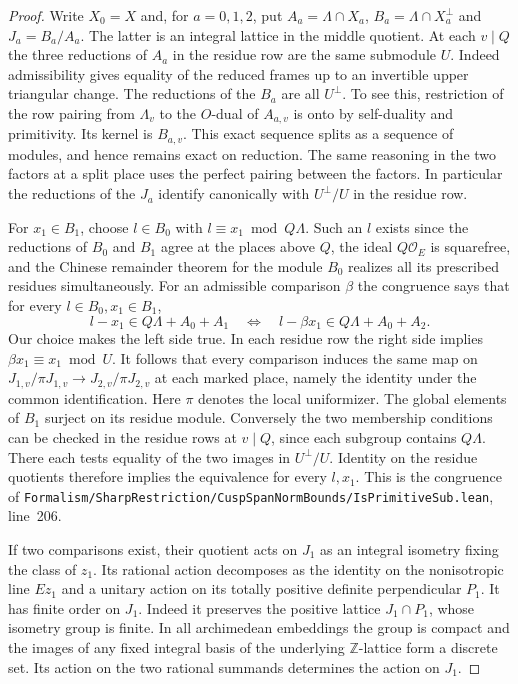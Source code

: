 \documentclass[a4paper,11pt]{article}
\theoremstyle{definition}
\theoremstyle{remark}
\newcommand{\ZZ}{\mathbb Z}\newcommand{\ord}{\operatorname{ord}}
\newcommand{\srcloc}[2]{{\small\nolinkurl{#1.lean}}, line~#2}
\numberwithin{equation}{section}
\newcommand{\OO}{\mathcal O}
\begin{document}
\begin{proof}
Write \(X_0=X\) and, for \(a=0,1,2\), put
\(A_a=\Lambda\cap X_a\), \(B_a=\Lambda\cap X_a^\perp\)
and \(J_a=B_a/A_a\). The latter is an integral lattice in
the middle quotient. At each \(v\mid Q\) the three reductions
of \(A_a\) in the residue row are the same submodule \(U\).
Indeed admissibility gives equality of the reduced frames up
to an invertible upper triangular change. The reductions of
the \(B_a\) are all \(U^\perp\). To see this, restriction of
the row pairing from \(\Lambda_v\) to the \(O\)-dual of
\(A_{a,v}\) is onto by self-duality and primitivity. Its
kernel is \(B_{a,v}\). This exact sequence splits as a
sequence of modules, and hence remains exact on reduction.
The same reasoning in the two factors at a split place uses
the perfect pairing between the factors. In particular
the reductions of the \(J_a\) identify canonically with
\(U^\perp/U\) in the residue row.

For \(x_1\in B_1\), choose \(l\in B_0\) with
\(l\equiv x_1\bmod Q\Lambda\). Such an \(l\) exists since
the reductions of \(B_0\) and \(B_1\) agree at the places
above \(Q\), the ideal \(Q\OO_E\) is squarefree, and the
Chinese remainder theorem for the module \(B_0\) realizes
all its prescribed residues simultaneously. For an admissible
comparison \(\beta\) the congruence says that for every
\(l\in B_0,x_1\in B_1\),
\[
 l-x_1\in Q\Lambda+A_0+A_1
       \quad\Longleftrightarrow\quad
 l-\beta x_1\in Q\Lambda+A_0+A_2 .
\]
Our choice makes the left side true. In each residue row
the right side implies \(\beta x_1\equiv x_1\bmod U\).
It follows that every comparison induces the same map on
\(J_{1,v}/\pi J_{1,v}\to J_{2,v}/\pi J_{2,v}\) at each marked place, namely
the identity under the common identification. Here \(\pi\)
denotes the local uniformizer. The global elements of \(B_1\)
surject on its residue module. Conversely the two membership
conditions can be checked in the residue rows at \(v\mid Q\),
since each subgroup contains \(Q\Lambda\). There each tests
equality of the two images in \(U^\perp/U\). Identity on
the residue quotients therefore implies the equivalence for
every \(l,x_1\). This is the congruence of
\srcloc{Formalism/SharpRestriction/CuspSpanNormBounds/IsPrimitiveSub}{206}.

If two comparisons exist, their quotient acts on \(J_1\) as
an integral isometry fixing the class of \(z_1\). Its
rational action decomposes as the identity on the nonisotropic
line \(Ez_1\) and a unitary action on its totally positive
definite perpendicular \(P_1\). It has finite order on \(J_1\).
Indeed it preserves the positive lattice \(J_1\cap P_1\),
whose isometry group is finite. In all archimedean embeddings
the group is compact and the images of any fixed integral
basis of the underlying \(\ZZ\)-lattice form a discrete set.
Its action on the two rational summands determines the action
on \(J_1\).


\end{proof}
\end{document}
